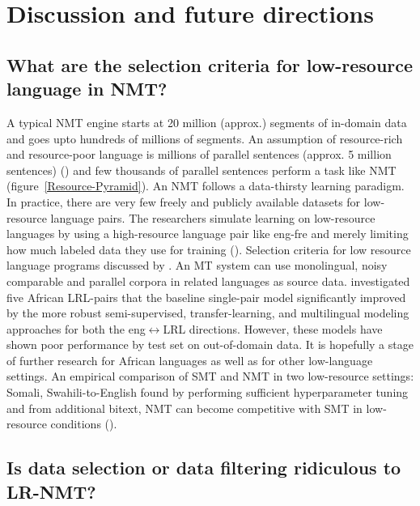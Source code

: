 \documentclass[manuscript,screen]{acmart}
\begin{document}
\section{Discussion and future directions}
\label{discussion}
\subsection{What are the selection criteria for low-resource language in NMT?}
A typical NMT engine starts at 20 million (approx.) segments of in-domain data and goes upto hundreds of millions of segments. An assumption of resource-rich and resource-poor language is millions of parallel sentences (approx. 5 million sentences) (\citet{koehn2017six}) and few thousands of parallel sentences perform a task like NMT (figure~\ref{Resource-Pyramid}). An NMT follows a data-thirsty learning paradigm. In practice, there are very few freely and publicly available datasets for low-resource language pairs. The researchers simulate learning on low-resource languages by using a high-resource language pair like eng-fre and merely limiting how much labeled data they use for training (\citet{johnson-etal-2017-googles}).
Selection criteria for low resource language programs discussed by \citet{cieri2016selection}. An MT system can use monolingual, noisy comparable and parallel corpora in related languages as source data. \citet{lakew2020low} investigated five African LRL-pairs that the baseline single-pair model significantly improved by the more robust semi-supervised, transfer-learning, and multilingual modeling approaches for both the eng$\leftrightarrow$LRL directions. However, these models have shown poor performance by test set on out-of-domain data. It is hopefully a stage of further research for African languages as well as for other low-language settings. An empirical comparison of SMT and NMT in two low-resource settings: {Somali, Swahili}-to-English found by performing sufficient hyperparameter tuning and from additional bitext, NMT can become competitive with SMT in low-resource conditions (\citet{duh2020benchmarking}).
\subsection{Is data selection or data filtering ridiculous to LR-NMT?}
 
\end{document}
